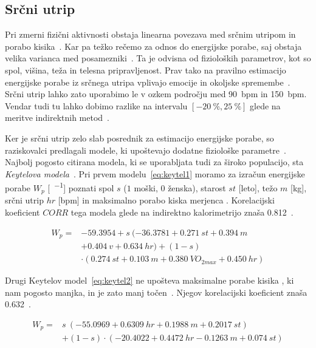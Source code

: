 \subsection{Srčni utrip}\label{sec:srcni-utrip}
Pri zmerni fizični aktivnosti obstaja linearna povezava med srčnim utripom in porabo kisika~\cite{keytel2005prediction}. Kar pa težko rečemo za odnos do energijske porabe, saj obstaja velika varianca med posamezniki~\cite{levine2005measurement}. Ta je odvisna od fizioloških parametrov, kot so spol, višina, teža in telesna pripravljenost. Prav tako na pravilno estimacijo energijske porabe iz srčnega utripa vplivajo emocije in okoljske spremembe~\cite{keytel2005prediction}. Srčni utrip lahko zato uporabimo le v ozkem področju med \SI{90}{bpm} in \SI{150}{bpm}. Vendar tudi tu lahko dobimo razlike na intervalu $[-20~\% , 25~\%]$ glede na meritve indirektnih metod~\cite{keytel2005prediction}. 

Ker je srčni utrip zelo slab posrednik za estimacijo energijske porabe, so raziskovalci predlagali modele, ki upoštevajo dodatne fiziološke parametre~\cite{charlot2014improvement}. Najbolj pogosto citirana modela, ki se uporabljata tudi za široko populacijo, sta \emph{Keytelova modela}~\cite{keytel2005prediction}. Pri prvem modelu~\eqref{eq:keytel1} moramo za izračun energijske porabe $W_p$ [\si{\kcal\per\min}] poznati spol $s$ ($1$ moški, $0$ ženska), starost $st$ [leto], težo $m$ [\si{\kg}], srčni utrip $hr$ [\si{bpm}] in maksimalno porabo kiska merjenca \vomax [\si{\ml\per\kg\per\min}]. Korelacijski koeficient $CORR$ tega modela glede na indirektno kalorimetrijo znaša \num{0.812}~\cite{charlot2014improvement}.

\begin{align} \label{eq:keytel1}
W_p = & \num{-59.3954} + s~(\num{-36.3781} + \num{0.271}~st + \num{0.394}~m  \nonumber \\
& + \num{0.404}~v + \num{0.634}~hr ) + (1 - s) \nonumber \\
&\cdot (\num{0.274}~st + \num{0.103}~m + \num{0.380}~VO_{2max} + \num{0.450}~hr)
\end{align}

Drugi Keytelov model~\eqref{eq:keytel2} ne upošteva maksimalne porabe kisika \vomax, ki nam pogosto manjka, in je zato manj točen~\cite{keytel2005prediction}. Njegov korelacijski koeficient \corr znaša \num{0.632}~\cite{charlot2014improvement}.

\begin{align}\label{eq:keytel2}
 W_p = & s~(\num{-55.0969} + \num{0.6309}~hr + \num{0.1988}~m + \num{0.2017}~st) \nonumber \\
 & + (1 - s) \cdot (\num{-20.4022} + \num{0.4472}~hr - \num{0.1263}~m + \num{0.074}~st)
\end{align}

